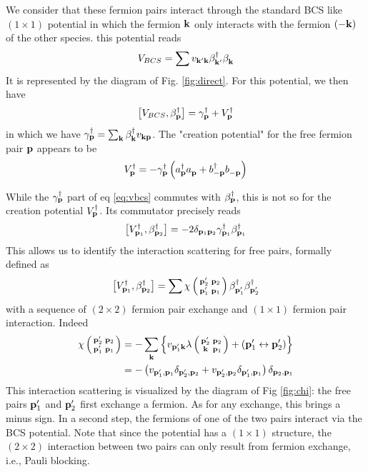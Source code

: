 \documentclass[aps,prb,amsmath,amssymb,preprint,superscriptaddress]{revtex4-1}
\begin{document}
We  consider that these fermion pairs interact through the standard BCS like $(1\times1)$ potential in which the fermion $\mathbf{k}$ only interacts with the fermion $\left(-\mathbf{k}\right)$ of the other species. this potential reads
\begin{equation}\label{eq:vbcs}
V_{BCS}=\sum{v_{\ensuremath{\mathbf{k}}'\ensuremath{\mathbf{k}}}\beta^{\dagger}_{\ensuremath{\mathbf{k}}'}\beta^{}_{\ensuremath{\mathbf{k}}}}
\end{equation}
It is represented by  the diagram of Fig. \ref{fig:direct}. For this potential, we then have 
\begin{equation}\label{eq:vbeta}
\left[V_{BCS},\beta^{\dagger}_{\mathbf{p}}\right]=\gamma^{\dagger}_{\mathbf{p}}+V^{\dagger}_{\mathbf{p}}
\end{equation}
in which we have $\gamma^{\dagger}_{\mathbf{p}}=\sum_{\mathbf{k}}\beta^{\dagger}_{\mathbf{k}}{}v_{\mathbf{k}\mathbf{p}}$. The "creation potential" for the free fermion pair $\mathbf{p}$ appears to be 
\begin{equation}\label{eq:betaV}
V^{\dagger}_{\mathbf{p}}=-{\gamma^{\dagger}_{\mathbf{p}}}\left(a^{\dagger}_{\mathbf{p}}a^{}_{\mathbf{p}}+b^{\dagger}_{-\mathbf{p}}b^{}_{-\mathbf{p}}\right)
\end{equation}

While the $\gamma^{\dagger}_{\mathbf{p}}$ part of eq \eqref{eq:vbcs} commutes with $\beta^{\dagger}_{\mathbf{p}}$, this is not so for the creation potential $V^{\dagger}_{\mathbf{p}}$.  Its commutator precisely reads
\begin{equation}\label{eq:vpotbeta}
\left[V^{\dagger}_{\mathbf{p}_1},\beta^{\dagger}_{\mathbf{p}_2}\right]=-2\delta_{\mathbf{p}_1\mathbf{p}_2}\gamma^{\dagger}_{\mathbf{p}_1}\beta^{\dagger}_{\mathbf{p}_1}
\end{equation}
This allows us to identify the interaction scattering for free pairs, formally defined as 
\begin{equation}\label{eq:vBeta}
\left[V^{\dagger}_{\mathbf{p}_1},\beta^{\dagger}_{\mathbf{p}_2}\right]=\sum\chi\left(\begin{smallmatrix}\mathbf{p}'_2&\mathbf{p}_2\\\mathbf{p}'_1&\mathbf{p}_1\end{smallmatrix}\right)\beta^{\dagger}_{\mathbf{p}'_1}\beta^{\dagger}_{\mathbf{p}'_2}
\end{equation}
with a sequence of $(2\times2)$ fermion pair exchange and $(1\times1)$ fermion pair interaction. Indeed
\begin{equation}\label{eq:interactSc}
\begin{split}
\chi\left(\begin{smallmatrix}\mathbf{p}'_2&\mathbf{p}_2\\\mathbf{p}'_1&\mathbf{p}_1\end{smallmatrix}\right)&=-\sum_{\mathbf{k}}\left\{v_{\mathbf{p}'_1\mathbf{k}}\lambda\left(\begin{smallmatrix}\mathbf{p}'_2&\mathbf{p}_2\\\mathbf{k}&\mathbf{p}_1\end{smallmatrix}\right)+\left(\mathbf{p}'_1\leftrightarrow\mathbf{p}'_2\right)\right\}\\
&=-\left(v_{\mathbf{p}'_1,\mathbf{p}_1}\delta_{\mathbf{p}'_2,\mathbf{p}_2}+v_{\mathbf{p}'_2,\mathbf{p}_2}\delta_{\mathbf{p}'_1,\mathbf{p}_1}\right)\delta_{\mathbf{p}_2,\mathbf{p}_1}
\end{split}
\end{equation}
This interaction scattering is visualized by  the diagram of Fig \ref{fig:chi}: the  free pairs $\mathbf{p}'_1$ and $\mathbf{p}'_2$ first exchange a fermion. As for any exchange, this brings a minus sign.  In a second step, the fermions of one of the two pairs interact via the BCS potential.  Note that since the potential has a $(1\times1)$ structure, the $(2\times2)$ interaction between two pairs can only result from fermion exchange, i.e., Pauli blocking. 
\end{document}

